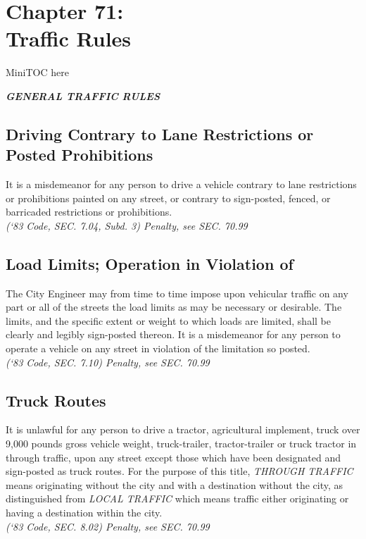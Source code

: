 \documentclass[code.tex]{subfiles}
\begin{document}
\chapter*{Chapter 71: \\
	Traffic Rules}

MiniTOC here
\pagebreak


\begin{center}
\emph{\textbf{\LARGE{GENERAL TRAFFIC RULES}}}
\end{center}
\section{Driving Contrary to Lane Restrictions or Posted Prohibitions}
It is a misdemeanor for any person to drive a vehicle contrary to lane restrictions or prohibitions painted on any street, or contrary to sign-posted, fenced, or barricaded restrictions or prohibitions.\\
\emph{(‘83 Code, SEC. 7.04, Subd. 3) Penalty, see SEC. 70.99}
\section{Load Limits; Operation in Violation of}
The City Engineer may from time to time impose upon vehicular traffic on any part or all of the streets the load limits as may be necessary or desirable. The limits, and the specific extent or weight to which loads are limited, shall be clearly and legibly sign-posted thereon. It is a misdemeanor for any person to operate a vehicle on any street in violation of the limitation so posted.\\
\emph{(‘83 Code, SEC. 7.10) Penalty, see SEC. 70.99}
\section{Truck Routes}
It is unlawful for any person to drive a tractor, agricultural implement, truck over 9,000 pounds gross vehicle weight, truck-trailer, tractor-trailer or truck tractor in through traffic, upon any street except those which have been designated and sign-posted as truck routes.  For the purpose of this title, \emph{THROUGH TRAFFIC} means originating without the city and with a destination without the city, as distinguished from \emph{LOCAL TRAFFIC} which means traffic either originating or having a destination within the city.\\
\emph{(‘83 Code, SEC. 8.02) Penalty, see SEC. 70.99}
\end{document}
